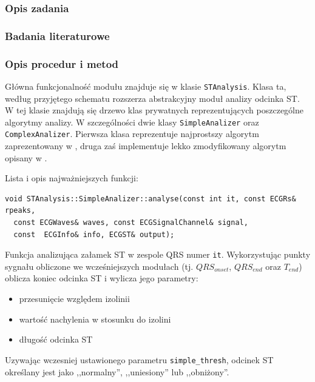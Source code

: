 \documentclass[a4paper, 11pt]{article}
\begin{document}
\subsubsection{Opis zadania}
\label{sec:st_interval:desc}

\subsubsection{Badania literaturowe}
\label{sec:st_interval:papers}

\subsubsection{Opis procedur i metod}
\label{sec:st_interval:procs}

Główna funkcjonalność modułu znajduje się w klasie \verb|STAnalysis|. Klasa ta,
według przyjętego schematu rozszerza abstrakcyjny moduł analizy odcinka ST. W
tej klasie znajdują się drzewo klas prywatnych reprezentujących poszczególne
algorytmy analizy. W szczególności dwie klasy \verb|SimpleAnalizer| oraz
\verb|ComplexAnalizer|. Pierwsza klasa reprezentuje najprostszy algorytm
zaprezentowany w \cite[p.~155]{AUGUST1}, druga zaś implementuje lekko
zmodyfikowany algorytm opisany w \cite{SHEN1}.

Lista i opis najważniejszych funkcji:

\begin{lstlisting}
void STAnalysis::SimpleAnalizer::analyse(const int it, const ECGRs& rpeaks,
  const ECGWaves& waves, const ECGSignalChannel& signal,
  const  ECGInfo& info, ECGST& output);
\end{lstlisting}

Funkcja analizująca załamek ST w zespole QRS numer \verb|it|. Wykorzystując
punkty sygnału obliczone we wcześniejszych modułach (tj. $QRS_{onset}$,
$QRS_{end}$ oraz $T_{end}$) oblicza koniec odcinka ST i wylicza jego parametry:
\begin{itemize}
  \item przesunięcie względem izolinii
  \item wartość nachylenia w stosunku do izolini
  \item długość odcinka ST
\end{itemize}
Uzywając wczesniej ustawionego parametru \verb|simple_thresh|, odcinek ST
określany jest jako ,,normalny'', ,,uniesiony'' lub ,,obniżony''.
\end{document}
